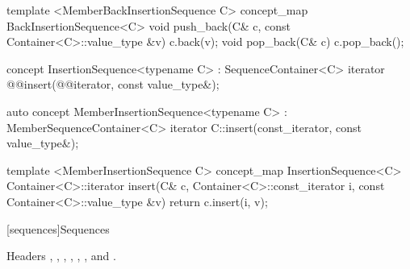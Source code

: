 \documentclass[american,twoside]{book}
\begin{document}
\begin{itemdescr}
\pnum
{}
\end{itemdescr}


\begin{itemdecl}
template <MemberBackInsertionSequence C> 
concept_map BackInsertionSequence<C> {
  void push_back(C& c, const Container<C>::value_type &v)    { c.back(v); }
  void pop_back(C& c)                                        { c.pop_back(); }
}			
\end{itemdecl}

\begin{itemdecl}
concept InsertionSequence<typename C> : SequenceContainer<C> {
  iterator @@insert(@@iterator, const value_type&);
}
\end{itemdecl}

\begin{itemdescr}
\pnum
{}
\end{itemdescr}

\begin{itemdecl}
auto concept MemberInsertionSequence<typename C> : MemberSequenceContainer<C> {
  iterator C::insert(const_iterator, const value_type&);
}
\end{itemdecl}

\begin{itemdecl}
template <MemberInsertionSequence C> 
concept_map InsertionSequence<C> {
  Container<C>::iterator insert(C& c, Container<C>::const_iterator i, const Container<C>::value_type &v)    
  { return c.insert(i, v); }
}			
\end{itemdecl}

\begin{itemdescr}
\pnum
{}
\end{itemdescr}



\color{black}

[sequences]{Sequences}

\pnum
Headers , , , , , , and .
\end{document}
